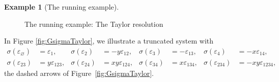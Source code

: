 \documentclass[12pt]{amsart}
\theoremstyle{plain}
\theoremstyle{definition}
\newtheorem{example}[theorem]{Example}
\newcommand{\eps}{\varepsilon}
\begin{document}
\begin{example}[The running example]
\begin{figure}[htbp]
    \caption{The running example: The Taylor resolution}
    \label{fig:runTaylor}
\end{figure}

In Figure \ref{fig:GsigmaTaylor}, we illustrate a truncated system with \[
        \begin{aligned}
            \sigma(\eps_\varnothing) &= \eps_1, & \sigma(\eps_2) &= -y \eps_{12}, & \sigma(\eps_3) &= -\eps_{13}, & \sigma(\eps_4) &= -x \eps_{14},\\
            \sigma(\eps_{23}) &= y \eps_{123}, & \sigma(\eps_{24}) &= xy \eps_{124}, & \sigma(\eps_{34}) &= x \eps_{134}, & \sigma(\eps_{234}) &= -xy \eps_{1234},
        \end{aligned}
    \]
    the dashed arrows of Figure~\ref{fig:GsigmaTaylor}.


\end{example}
\end{document}

